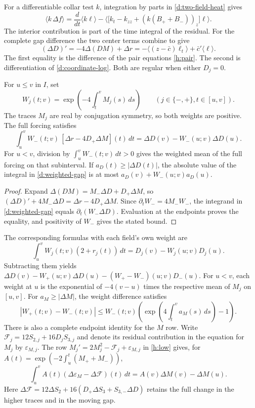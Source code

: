 For a differentiable collar test \(k\), integration by parts in
\eqref{d:two-field-heat} gives
\[
 \langle k\,\Delta f\rangle
 =\frac{d}{dt}\langle k\ell\rangle
 -\big\langle\big[k_t-k_{zz}+(k(B_++B_-))_z\big]\ell\big\rangle .
\]
The interior contribution is part of the time integral of the residual.
For the complete gap difference the two center terms combine to give
\begin{equation}
 (\Delta D)'=-4\Delta(DM)+\Delta r
   =-\langle (z-\bar c)\ell_t\rangle
           +\bar c'\langle\ell\rangle .
 \label{d:raw-gap}
\end{equation}
The first equality is the difference of the pair equations
\eqref{h:pair}. The second is differentiation of
\eqref{d:coordinate-log}. Both are regular when either \(D_j=0\).

\begin{theorem}
\label{d:transport}
For \(u\le v\) in \(I\), set
\[
 W_j(t;v)=\exp\left(-4\int_t^v M_j(s)\,ds\right)
 \qquad(j\in\{-,+\}, t\in[u,v]).
\]
The traces \(M_j\) are real by conjugation symmetry, so both weights
are positive. The full forcing satisfies
\begin{equation}
 \int_u^v W_-(t;v)\,[\Delta r-4D_+\Delta M](t)\,dt
   =\Delta D(v)-W_-(u;v)\Delta D(u).
 \label{d:weighted-gap}
\end{equation}
For \(u<v\), division by \(\int_u^v W_-(t;v)\,dt>0\) gives the
weighted mean of the full forcing on that subinterval. If
\(a_D(t)\ge|\Delta D(t)|\), the absolute value of the integral in
\eqref{d:weighted-gap} is at most \(a_D(v)+W_-(u;v)a_D(u)\).
\end{theorem}

\begin{proof}
Expand \(\Delta(DM)=M_-\Delta D+D_+\Delta M\), so
\((\Delta D)'+4M_-\Delta D=\Delta r-4D_+\Delta M\).
Since \(\partial_t W_-=4M_-W_-\), the integrand in
\eqref{d:weighted-gap} equals \(\partial_t(W_-\Delta D)\).
Evaluation at the endpoints proves the equality, and positivity
of \(W_-\) gives the stated bound.
\end{proof}

The corresponding formulas with each field's own weight are
\[
 \int_u^v W_j(t;v)(2+r_j(t))\,dt=D_j(v)-W_j(u;v)D_j(u).
\]
Subtracting them yields
\(\Delta D(v)-W_+(u;v)\Delta D(u)
 -(W_+-W_-)(u;v)D_-(u)\).
For \(u<v\), each weight at \(u\) is the exponential of \(-4(v-u)\)
times the respective mean of \(M_j\) on \([u,v]\).
For \(a_M\ge|\Delta M|\), the weight difference satisfies
\[
 |W_+(t;v)-W_-(t;v)|
 \le W_-(t;v)\left(\exp\left(4\int_t^v a_M(s)\,ds\right)-1\right).
\]
There is also a complete endpoint identity for the \(M\) row.
Write \(\mathcal F_j=12S_{2,j}+16D_jS_{3,j}\) and denote its
residual contribution in the equation for \(M_j\) by \(\varepsilon_{M,j}\).
The row \(M_j'=2M_j^2-\mathcal F_j+\varepsilon_{M,j}\) in
\eqref{h:low} gives, for
\(A(t)=\exp(-2\int_u^t(M_++M_-))\),
\[
 \int_u^v A(t)(\Delta\varepsilon_M-\Delta\mathcal F)(t)\,dt
   = A(v)\Delta M(v)-\Delta M(u).
\]
Here \(\Delta\mathcal F=12\Delta S_2+
16(D_+\Delta S_3+S_{3,-}\Delta D)\) retains the full change
in the higher traces and in the moving gap.

